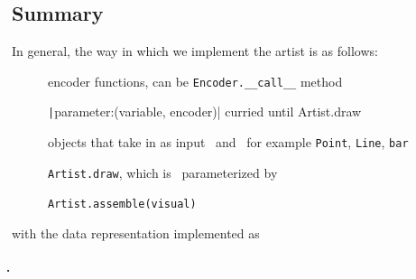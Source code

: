 \documentclass[../main.tex]{subfiles}
\begin{document}
\subsection{Summary}
In general, the way in which we implement the artist is as follows: 
\begin{description}
    \item[\textbf{\vchannel}] encoder functions, can be \texttt{Encoder.__call__} method
    \item[\textbf{\vtotal}]  \texttt|{parameter:(variable, encoder)}| curried until {Artist.draw}
    \item[\textbf{\vartisteq}] objects that take in as input \dtotal\ and \vtotal\, for example \texttt{Point}, \texttt{Line}, \texttt{bar}
    \item[\textbf{\vartist}] \texttt{Artist.draw}, which is \vartisteq\ parameterized by \vtotal
   
    \item[\textbf{\vmarkd}] \texttt{Artist.assemble(visual)}  
\end{description}

with the data representation implemented as 
\begin{description}
    \item[\textbf{\dtotal}]
    \item[\textbf{\dfiber}]
    \item[\textbf{\d}]  
\end{description}    

\end{document}
